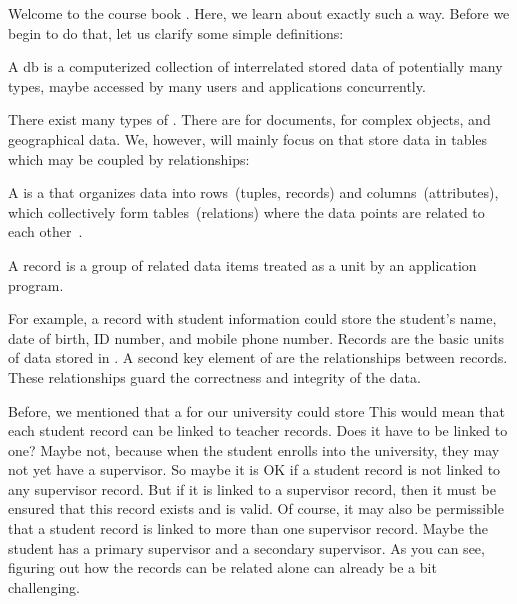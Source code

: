 \hsection{}%
%
%

Welcome to the course book .
Here, we learn about exactly such a way.
Before we begin to do that, let us clarify some simple definitions:%
%
\begin{definition}[Database]%
A \acrfull{db} is a computerized collection of interrelated stored data of potentially many types, maybe accessed by many users and applications concurrently.%
\end{definition}%
%
There exist many types of .
There are  for documents,  for complex objects, and  geographical data.
We, however, will mainly focus on  that store data in tables which may be coupled by relationships:%
%
\begin{definition}%
A  is a  that organizes data into rows~(tuples, records) and columns~(attributes), which collectively form tables~(relations) where the data points are related to each other~\cite{I2021WIARDB,C1970ARMODFLSDB,SC1975OTPOARADI,T2018ISARD,H2016RDDAI,HM2024IMARD}.
\end{definition}%
%
\begin{definition}[Record]%
A record is a group of related data items treated as a unit by an application program.%
\end{definition}%
%
For example, a record with student information could store the student's name, date of birth, ID number, and mobile phone number.
Records are the basic units of data stored in .
A second key element of  are the relationships between records.
These relationships guard the correctness and integrity of the data.

Before, we mentioned that a  for our university could store 
This would mean that each student record can be linked to teacher records.
Does it have to be linked to one?
Maybe not, because when the student enrolls into the university, they may not yet have a supervisor.
So maybe it is OK if a student record is not linked to any supervisor record.
But if it is linked to a supervisor record, then it must be ensured that this record exists and is valid.
Of course, it may also be permissible that a student record is linked to more than one supervisor record.
Maybe the student has a primary supervisor and a secondary supervisor.
As you can see, figuring out how the records can be related alone can already be a bit challenging.%

